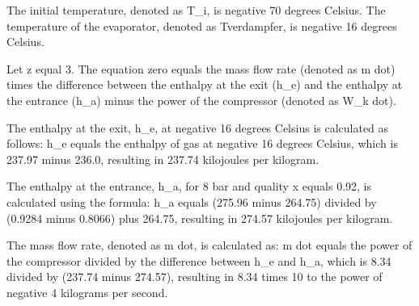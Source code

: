 The initial temperature, denoted as T_i, is negative 70 degrees Celsius.
The temperature of the evaporator, denoted as Tverdampfer, is negative 16 degrees Celsius.

Let z equal 3.
The equation zero equals the mass flow rate (denoted as m dot) times the difference between the enthalpy at the exit (h_e) and the enthalpy at the entrance (h_a) minus the power of the compressor (denoted as W_k dot).

The enthalpy at the exit, h_e, at negative 16 degrees Celsius is calculated as follows:
h_e equals the enthalpy of gas at negative 16 degrees Celsius, which is 237.97 minus 236.0, resulting in 237.74 kilojoules per kilogram.

The enthalpy at the entrance, h_a, for 8 bar and quality x equals 0.92, is calculated using the formula:
h_a equals (275.96 minus 264.75) divided by (0.9284 minus 0.8066) plus 264.75, resulting in 274.57 kilojoules per kilogram.

The mass flow rate, denoted as m dot, is calculated as:
m dot equals the power of the compressor divided by the difference between h_e and h_a, which is 8.34 divided by (237.74 minus 274.57), resulting in 8.34 times 10 to the power of negative 4 kilograms per second.